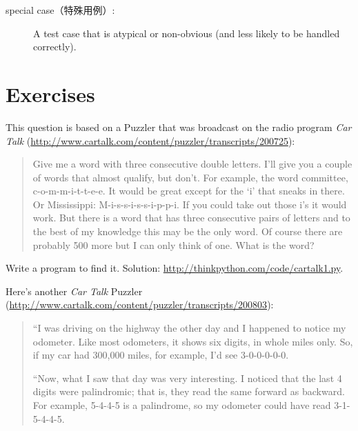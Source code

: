 \documentclass[10pt]{book}
\begin{document}
\begin{CJK}{UTF8}{gbsn}
\begin{description}
\item[special case（特殊用例）:] A test case that is atypical or non-obvious
(and less likely to be handled correctly).

\end{description}


\section{Exercises}

\begin{exercise}

This question is based on a Puzzler that was broadcast on the radio
program {\em Car Talk} 
(\url{http://www.cartalk.com/content/puzzler/transcripts/200725}):

\begin{quote}
Give me a word with three consecutive double letters. I'll give you a
couple of words that almost qualify, but don't. For example, the word
committee, c-o-m-m-i-t-t-e-e. It would be great except for the `i' that
sneaks in there. Or Mississippi: M-i-s-s-i-s-s-i-p-p-i. If you could
take out those i's it would work. But there is a word that has three
consecutive pairs of letters and to the best of my knowledge this may
be the only word. Of course there are probably 500 more but I can only
think of one. What is the word?
\end{quote}

Write a program to find it.  Solution: \url{http://thinkpython.com/code/cartalk1.py}.

\end{exercise}


\begin{exercise}
Here's another {\em Car Talk}
Puzzler (\url{http://www.cartalk.com/content/puzzler/transcripts/200803}):

\begin{quote}
``I was driving on the highway the other day and I happened to
notice my odometer. Like most odometers, it shows six digits,
in whole miles only. So, if my car had 300,000
miles, for example, I'd see 3-0-0-0-0-0.

``Now, what I saw that day was very interesting. I noticed that the
last 4 digits were palindromic; that is, they read the same forward as
backward. For example, 5-4-4-5 is a palindrome, so my odometer
could have read 3-1-5-4-4-5.


\end{quote}
\end{exercise}
\end{CJK}
\end{document}
